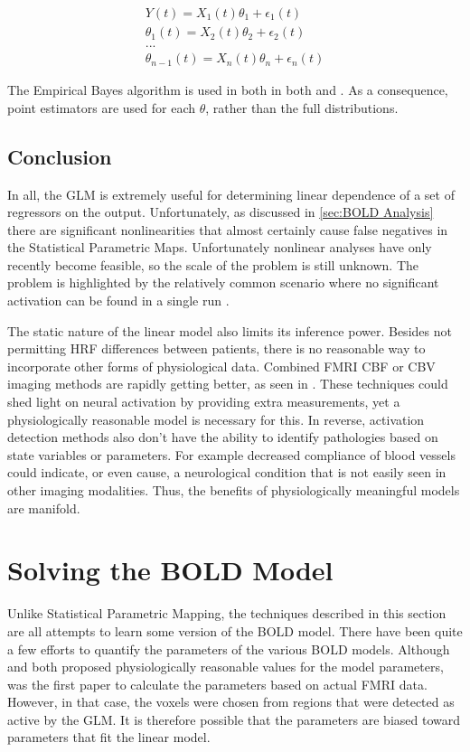 \begin{eqnarray}
\label{eq:Hierarchical}
Y(t) = X_1(t)\theta_1 + \epsilon_1(t)            \nonumber \\
\theta_1(t) = X_2(t)\theta_2 + \epsilon_2(t)     \nonumber \\
...                                              \nonumber \\
\theta_{n-1}(t) = X_n(t)\theta_n + \epsilon_n(t) 
\end{eqnarray}

The Empirical Bayes algorithm is used in both in both \cite{Friston2002} 
and \cite{Hoffman1997}. As a consequence, point estimators 
are used for each $\theta$, rather than the full distributions.

\subsection{Conclusion}
In all, the GLM is extremely useful for determining linear 
dependence of a set of regressors on the output. Unfortunately, as discussed in
\autoref{sec:BOLD Analysis} there are significant nonlinearities 
that almost certainly cause false negatives in the Statistical Parametric
Maps. Unfortunately nonlinear analyses have only recently become feasible,
so the scale of the problem is still unknown. The problem is 
highlighted by the relatively common scenario where no significant
activation can be found in a single run \cite{Riera2004}
\cite{Johnston2008}.  

The static nature of the  linear model also limits its inference power. 
Besides not permitting HRF differences between patients, there is no
reasonable way to incorporate other forms of physiological
data. Combined FMRI CBF or CBV imaging methods are rapidly getting better,
as seen in \cite{Chan2009}. These techniques could shed light on
neural activation by providing extra measurements, yet a 
physiologically reasonable model is necessary for this.
In reverse, activation detection methods also don't have the ability 
to identify pathologies based on state variables or parameters. For
example decreased compliance of
blood vessels could indicate, or even cause, a neurological condition that 
is not easily seen in other imaging modalities. Thus, the benefits
of physiologically meaningful models are manifold.

\section{Solving the BOLD Model}
Unlike Statistical Parametric Mapping, the techniques described in this
section are all attempts to learn some version of the BOLD model. 
There have been quite a few efforts to quantify the parameters of the
various BOLD models.  Although \cite{Buxton1998} and \cite{Friston2000}
both proposed physiologically reasonable values for the model parameters, 
\cite{Friston2002} was the first paper to calculate the parameters based 
on actual FMRI data. However, in that case, the voxels were chosen from
regions that were detected as active by the GLM. It is therefore possible
that the parameters are biased toward parameters that fit the linear model.

